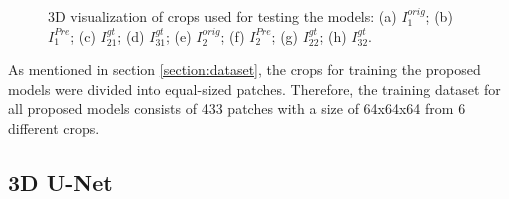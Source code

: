 \begin{figure}[!htb]
\hfil 
{}\hfil
{}\hfil
{}
\caption{3D visualization of crops used for testing the models: (a) $I^{orig}_1$; (b) $I^{Pre}_1$; (c) $I^{gt}_{21}$; (d) $I^{gt}_{31}$; (e) $I^{orig}_2$; (f)  $I^{Pre}_2$; (g) $I^{gt}_{22}$; (h) $I^{gt}_{32}$.}

\label{fig:dataset}

\end{figure}

As mentioned in section \ref{section:dataset}, the crops for training the proposed models were divided into equal-sized patches. Therefore, the training dataset for all proposed models consists of 433 patches with a size of 64x64x64 from 6 different crops.

\subsection{3D U-Net}

